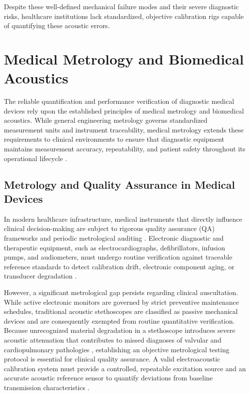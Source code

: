 Despite these well-defined mechanical failure modes and their severe diagnostic risks, healthcare institutions lack standardized, objective calibration rigs capable of quantifying these acoustic errors.



\section{Medical Metrology and Biomedical Acoustics}

The reliable quantification and performance verification of diagnostic medical devices rely upon the established principles of medical metrology and biomedical acoustics. While general engineering metrology governs standardized measurement units and instrument traceability, medical metrology extends these requirements to clinical environments to ensure that diagnostic equipment maintains measurement accuracy, repeatability, and patient safety throughout its operational lifecycle \cite{badnjevic2015medical, webster2010medical}.

\subsection{Metrology and Quality Assurance in Medical Devices}

In modern healthcare infrastructure, medical instruments that directly influence clinical decision-making are subject to rigorous quality assurance (QA) frameworks and periodic metrological auditing \cite{badnjevic2015medical}. Electronic diagnostic and therapeutic equipment, such as electrocardiographs, defibrillators, infusion pumps, and audiometers, must undergo routine verification against traceable reference standards to detect calibration drift, electronic component aging, or transducer degradation \cite{badnjevic2015medical, webster2010medical}.

However, a significant metrological gap persists regarding clinical auscultation. While active electronic monitors are governed by strict preventive maintenance schedules, traditional acoustic stethoscopes are classified as passive mechanical devices and are consequently exempted from routine quantitative verification. Because unrecognized material degradation in a stethoscope introduces severe acoustic attenuation that contributes to missed diagnoses of valvular and cardiopulmonary pathologies \cite{ertel1966stethoscope, gardezi2017cardiac}, establishing an objective metrological testing protocol is essential for clinical quality assurance. A valid electroacoustic calibration system must provide a controlled, repeatable excitation source and an accurate acoustic reference sensor to quantify deviations from baseline transmission characteristics \cite{klum2019validation}.

